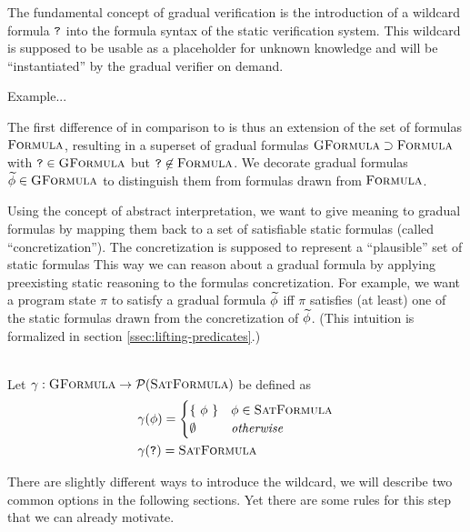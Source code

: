 
The fundamental concept of gradual verification is the introduction of a wildcard formula $\textup{\texttt{?}}$ into the formula syntax of the static verification system.
This wildcard is supposed to be usable as a placeholder for unknown knowledge and will be “instantiated” by the gradual verifier on demand.

Example...


The first difference of \gvl in comparison to \svl is thus an extension of the set of formulas $\textup{\textsc{Formula}}$, resulting in a superset of gradual formulas $\textup{\textsc{GFormula}} \supset \textup{\textsc{Formula}}$ with $\textup{\texttt{?}} \in \textup{\textsc{GFormula}}$ but $\textup{\texttt{?}} \not \in \textup{\textsc{Formula}}$.
We decorate gradual formulas $\widetilde{\phi} \in \textup{\textsc{GFormula}}$ to distinguish them from formulas drawn from $\textup{\textsc{Formula}}$.

Using the concept of abstract interpretation, we want to give meaning to gradual formulas by mapping them back to a set of satisfiable static formulas (called “concretization”).
The concretization is supposed to represent a “plausible” set of static formulas
This way we can reason about a gradual formula by applying preexisting static reasoning to the formulas concretization.
For example, we want a program state $\pi$ to satisfy a gradual formula $\widetilde{\phi}$ iff $\pi$ satisfies (at least) one of the static formulas drawn from the concretization of $\widetilde{\phi}$.
(This intuition is formalized in section \ref{ssec:lifting-predicates}.)

\begin{definition}[Concretization]~\\
    Let $\gamma : \textup{\textsc{GFormula}} \rightarrow \mathcal{P}(\textup{\textsc{SatFormula}})$ be defined as
    \begin{align*}
    &\gamma(\phi) = 
        \begin{cases}
        \{~ \phi ~\}  & \phi \in \textup{\textsc{SatFormula}}\\
        \emptyset     & \textit{otherwise}
        \end{cases}\\
    &\gamma(\textup{\texttt{?}}) = \textup{\textsc{SatFormula}}
    \end{align*}
\end{definition}





There are slightly different ways to introduce the wildcard, we will describe two common options in the following sections.
Yet there are some rules for this step that we can already motivate.
